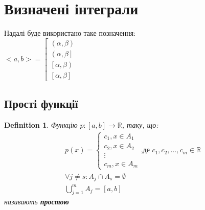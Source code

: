 \documentclass[a4paper, 14pt]{extarticle}
\theoremstyle{theoremdd}
\theoremstyle{theoremdd}
\newtheorem{definition}[theorem]{Definition}
\theoremstyle{theoremdd}
\theoremstyle{theoremdd}
\theoremstyle{theoremdd}
\theoremstyle{theoremdd}
\theoremstyle{theoremdd}
\theoremstyle{theoremdd}
\begin{document}
\section{Визначені інтеграли}
Надалі буде використано таке позначення:\\ $<a,b> = \left[ \begin{gathered} \left(\alpha,\beta \right) \\ \left(\alpha, \beta \right] \\ \left[\alpha, \beta \right) \\ \left[\alpha, \beta \right] \end{gathered} \right.$

\subsection{Прості функції}
\begin{definition}
Функцію $p:[a,b] \to \mathbb{R}$, таку, що:
\begin{align*}
p(x) = \begin{cases} c_1, x \in A_1 \\ c_2, x \in A_2 \\ \vdots \\ c_m, x \in A_m \end{cases} \text{,де } c_1, c_2, \dots, c_m \in \mathbb{R} \\ \forall j \neq s: A_j \cap A_s = \emptyset
\\
\bigcup_{j=1}^m A_j = [a,b]
\end{align*}
називають \textbf{простою}
\end{definition}
\end{document}
